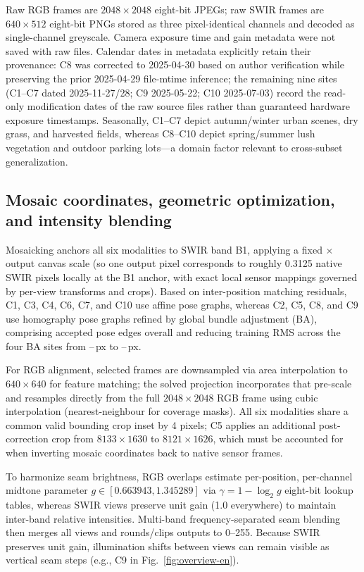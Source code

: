 \documentclass[a4paper,10pt]{article}
\begin{document}
Raw RGB frames are $2048\times2048$ eight-bit JPEGs; raw SWIR frames are $640\times512$ eight-bit PNGs stored as three pixel-identical channels and decoded as single-channel greyscale. Camera exposure time and gain metadata were not saved with raw files. Calendar dates in metadata explicitly retain their provenance: C8 was corrected to 2025-04-30 based on author verification while preserving the prior 2025-04-29 file-mtime inference; the remaining nine sites (C1--C7 dated 2025-11-27/28; C9 2025-05-22; C10 2025-07-03) record the read-only modification dates of the raw source files rather than guaranteed hardware exposure timestamps. Seasonally, C1--C7 depict autumn/winter urban scenes, dry grass, and harvested fields, whereas C8--C10 depict spring/summer lush vegetation and outdoor parking lots—a domain factor relevant to cross-subset generalization.

\subsection{Mosaic coordinates, geometric optimization, and intensity blending}
Mosaicking anchors all six modalities to SWIR band B1, applying a fixed \DatasetOutputScale{}$\times$ output canvas scale (so one output pixel corresponds to roughly 0.3125 native SWIR pixels locally at the B1 anchor, with exact local sensor mappings governed by per-view transforms and crops). Based on inter-position matching residuals, C1, C3, C4, C6, C7, and C10 use affine pose graphs, whereas C2, C5, C8, and C9 use homography pose graphs refined by global bundle adjustment (BA), comprising \DatasetPoseEdgeCount{} accepted pose edges overall and reducing training RMS across the four BA sites from \GeomBaBeforeMin--\GeomBaBeforeMax\,px to \GeomBaAfterMin--\GeomBaAfterMax\,px.

For RGB alignment, selected frames are downsampled via area interpolation to $640\times640$ for feature matching; the solved projection incorporates that pre-scale and resamples directly from the full $2048\times2048$ RGB frame using cubic interpolation (nearest-neighbour for coverage masks). All six modalities share a common valid bounding crop inset by 4 pixels; C5 applies an additional post-correction crop from $8133\times1630$ to $8121\times1626$, which must be accounted for when inverting mosaic coordinates back to native sensor frames.

To harmonize seam brightness, RGB overlaps estimate per-position, per-channel midtone parameter $g\in[0.663943,1.345289]$ via $\gamma=1-\log_2 g$ eight-bit lookup tables, whereas SWIR views preserve unit gain (1.0 everywhere) to maintain inter-band relative intensities. Multi-band frequency-separated seam blending then merges all views and rounds/clips outputs to 0--255. Because SWIR preserves unit gain, illumination shifts between views can remain visible as vertical seam steps (e.g., C9 in Fig.~\ref{fig:overview-en}).
\end{document}

